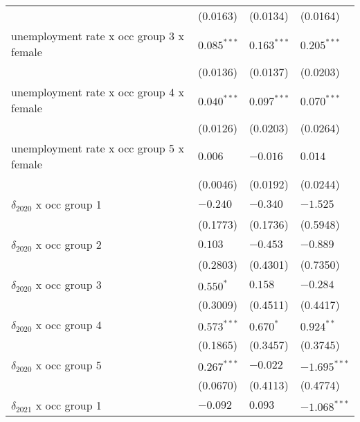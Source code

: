 \begin{tabular}{llll}
                                         &           (0.0163) &           (0.0134) &           (0.0164) \\
unemployment rate x occ group 3 x female &      $0.085^{***}$ &      $0.163^{***}$ &      $0.205^{***}$ \\
                                         &           (0.0136) &           (0.0137) &           (0.0203) \\
unemployment rate x occ group 4 x female &      $0.040^{***}$ &      $0.097^{***}$ &      $0.070^{***}$ \\
                                         &           (0.0126) &           (0.0203) &           (0.0264) \\
unemployment rate x occ group 5 x female &            $0.006$ &           $-0.016$ &            $0.014$ \\
                                         &           (0.0046) &           (0.0192) &           (0.0244) \\
$\delta_{2020}$ x occ group 1            &           $-0.240$ &           $-0.340$ &           $-1.525$ \\
                                         &           (0.1773) &           (0.1736) &           (0.5948) \\
$\delta_{2020}$ x occ group 2            &            $0.103$ &           $-0.453$ &           $-0.889$ \\
                                         &           (0.2803) &           (0.4301) &           (0.7350) \\
$\delta_{2020}$ x occ group 3            &          $0.550^*$ &            $0.158$ &           $-0.284$ \\
                                         &           (0.3009) &           (0.4511) &           (0.4417) \\
$\delta_{2020}$ x occ group 4            &      $0.573^{***}$ &          $0.670^*$ &       $0.924^{**}$ \\
                                         &           (0.1865) &           (0.3457) &           (0.3745) \\
$\delta_{2020}$ x occ group 5            &      $0.267^{***}$ &           $-0.022$ &     $-1.695^{***}$ \\
                                         &           (0.0670) &           (0.4113) &           (0.4774) \\
$\delta_{2021}$ x occ group 1            &           $-0.092$ &            $0.093$ &     $-1.068^{***}$ \\

\end{tabular}
